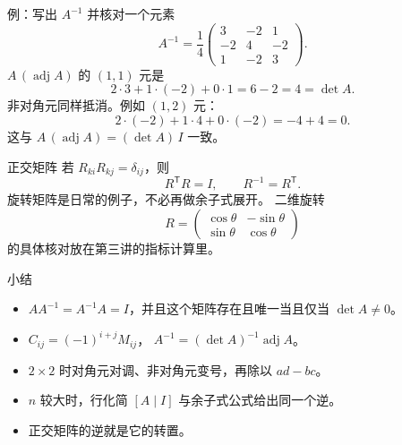 \documentclass[fontset=windows, chinese, 10pt, xcolor=dvipsnames]{beamer}
\begin{document}
\begin{frame}{例：写出 $A^{-1}$ 并核对一个元素}
  \begin{equation*}
    A^{-1}
    =\frac14
    \begin{pmatrix}
      3&-2&1\\
      -2&4&-2\\
      1&-2&3
    \end{pmatrix}.
  \end{equation*}
  $A\,(\operatorname{adj} A)$ 的 $(1,1)$ 元是
  \begin{equation*}
    2\cdot 3+1\cdot(-2)+0\cdot 1=6-2=4=\det A.
  \end{equation*}
  非对角元同样抵消。例如 $(1,2)$ 元：
  \begin{equation*}
    2\cdot(-2)+1\cdot 4+0\cdot(-2)=-4+4=0.
  \end{equation*}
  这与 $A\,(\operatorname{adj} A)=(\det A)\,I$ 一致。
\end{frame}

\begin{frame}{正交矩阵}
  若 $R_{ki}R_{kj}=\delta_{ij}$，则
  \begin{equation*}
    R^{\mathsf T}R=I,
    \qquad
    R^{-1}=R^{\mathsf T}.
  \end{equation*}
  旋转矩阵是日常的例子，不必再做余子式展开。
  二维旋转
  \begin{equation*}
    R=
    \begin{pmatrix}
      \cos\theta & -\sin\theta \\
      \sin\theta & \cos\theta
    \end{pmatrix}
  \end{equation*}
  的具体核对放在第三讲的指标计算里。
\end{frame}

\begin{frame}{小结}
  \begin{itemize}
    \item $AA^{-1}=A^{-1}A=I$，并且这个矩阵存在且唯一当且仅当 $\det A\neq 0$。
    \item $C_{ij}=(-1)^{i+j}M_{ij}$，
      $A^{-1}=(\det A)^{-1}\operatorname{adj} A$。
    \item $2\times 2$ 时对角元对调、非对角元变号，再除以 $ad-bc$。
    \item $n$ 较大时，行化简 $[A\mid I]$ 与余子式公式给出同一个逆。
    \item 正交矩阵的逆就是它的转置。
  \end{itemize}
\end{frame}
\end{document}
